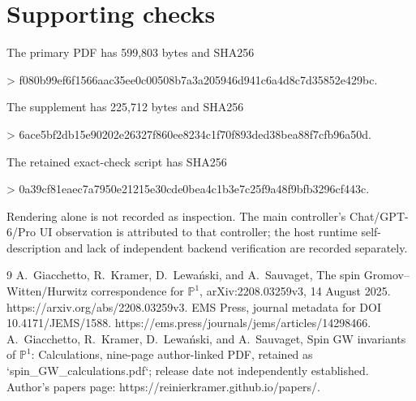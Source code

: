 \documentclass[10pt]{article}
\begin{document}
\section*{Supporting checks}
The primary PDF has 599,803 bytes and SHA256\par
> f080b99ef6f1566aac35ee0c00508b7a3a205946d941c6a4d8c7d35852e429bc.\par
The supplement has 225,712 bytes and SHA256\par
> 6ace5bf2db15e90202e26327f860ee8234c1f70f893ded38bea88f7cfb96a50d.\par
The retained exact-check script has SHA256\par
> 0a39cf81eaec7a7950e21215e30cde0bea4c1b3e7c25f9a48f9bfb3296cf443c.\par
Rendering alone is not recorded as inspection. The main controller’s Chat/GPT-6/Pro UI observation is attributed to that controller; the host runtime self-description and lack of independent backend verification are recorded separately.\par
9 A. Giacchetto, R. Kramer, D. Lewański, and A. Sauvaget, The spin Gromov–Witten/Hurwitz correspondence for \(\mathbb P^1\), arXiv:2208.03259v3, 14 August 2025. https://arxiv.org/abs/2208.03259v3. EMS Press, journal metadata for DOI 10.4171/JEMS/1588. https://ems.press/journals/jems/articles/14298466. A. Giacchetto, R. Kramer, D. Lewański, and A. Sauvaget, Spin GW invariants of \(\mathbb P^1\): Calculations, nine-page author-linked PDF, retained as `spin\_GW\_calculations.pdf`; release date not independently established. Author’s papers page: https://reinierkramer.github.io/papers/.\par
\end{document}
